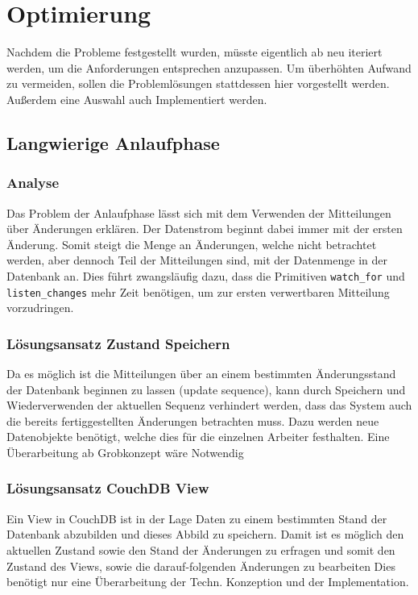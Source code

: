 \chapter{Optimierung}

Nachdem die Probleme festgestellt wurden,
müsste eigentlich ab  neu iteriert werden,
um die Anforderungen entsprechen anzupassen.
Um überhöhten Aufwand zu vermeiden,
sollen die Problemlösungen stattdessen hier vorgestellt werden.
Außerdem eine Auswahl auch Implementiert werden.

\section{Langwierige Anlaufphase}

\subsection{Analyse}

Das Problem der Anlaufphase lässt sich mit dem Verwenden der Mitteilungen über Änderungen erklären. Der Datenstrom beginnt dabei immer mit der ersten Änderung.
Somit steigt die Menge an Änderungen, welche nicht betrachtet werden, aber dennoch Teil der Mitteilungen sind, mit der Datenmenge in der Datenbank an.
Dies führt zwangsläufig dazu, dass die Primitiven \verb|watch_for| und \verb|listen_changes| mehr Zeit benötigen, um zur ersten verwertbaren Mitteilung vorzudringen.


\subsection{Lösungsansatz Zustand Speichern}

Da es möglich ist die Mitteilungen über an einem bestimmten Änderungsstand der 
Datenbank beginnen zu lassen (update sequence),
kann durch Speichern und Wiederverwenden der aktuellen Sequenz verhindert werden,
dass das System auch die bereits fertiggestellten Änderungen betrachten muss.
Dazu werden neue Datenobjekte benötigt, welche dies für die einzelnen Arbeiter festhalten. Eine Überarbeitung ab Grobkonzept wäre Notwendig


\subsection{Lösungsansatz CouchDB View}

Ein View in CouchDB ist in der Lage Daten zu einem bestimmten Stand der Datenbank abzubilden und dieses Abbild zu speichern.
Damit ist es möglich den aktuellen Zustand sowie den Stand der Änderungen zu erfragen und somit den Zustand des Views, sowie die darauf-folgenden Änderungen zu bearbeiten 
Dies benötigt nur eine Überarbeitung der Techn. Konzeption und der Implementation.


